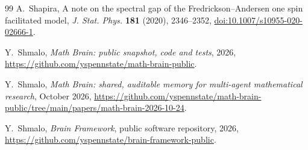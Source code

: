 \documentclass[11pt]{article}
\theoremstyle{remark}
\newcommand{\1}{\mathbf 1}
\begin{document}
\begin{thebibliography}{99}
A.~Shapira,
A note on the spectral gap of the Fredrickson--Andersen one spin facilitated model,
\emph{J. Stat. Phys.} \textbf{181} (2020), 2346--2352,
\href{https://doi.org/10.1007/s10955-020-02666-1}{doi:10.1007/s10955-020-02666-1}.

 Y.~Shmalo, \emph{Math Brain: public snapshot, code and tests}, 2026, \url{https://github.com/yspennstate/math-brain-public}.

 Y.~Shmalo, \emph{Math Brain: shared, auditable memory for multi-agent mathematical research}, October 2026, \url{https://github.com/yspennstate/math-brain-public/tree/main/papers/math-brain-2026-10-24}.

 Y.~Shmalo, \emph{Brain Framework}, public software repository, 2026, \url{https://github.com/yspennstate/brain-framework-public}.

\end{thebibliography}
\end{document}
